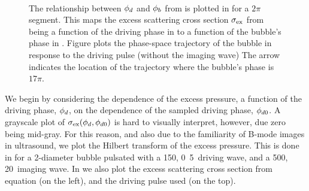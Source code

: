  \begin{figure}[p]
   \centering 
   \\
   \label{fig:FreqRatio}
    \caption{
      The relationship between ${\phi_d}$ and ${\phi_b}$ from  is plotted in  
      for a $2\pi$ segment.
      This maps the excess scattering cross section $\sigma_\textrm{ex}$ from being a function of the driving phase in 
       to a function of the bubble's phase in 
      .
      Figure  plots the phase-space trajectory of the 
      bubble in response to the driving pulse (without the imaging wave)
      The arrow indicates the location of the trajectory where the bubble's phase is $17\pi$.
   }
   \label{fig:excess_vs_phase:mapping}
 \end{figure}
We begin by considering the dependence of the excess pressure, a function of the driving phase, ${\phi_d}$,
on the dependence of the sampled driving phase, ${\phi_{d0}}$.
%
%
A grayscale plot of $\sigma_\textrm{ex}({\phi_d},{\phi_{d0}})$ is hard to visually interpret, however,
due zero being mid-gray.
For this reason, and also due to the familiarity of B-mode images in ultrasound,
we plot the Hilbert transform of the excess pressure.
This is done in   for a \unit{2}\micro\metre-diameter 
bubble pulsated with a \unit{150}\kilo\pascal, 
\unit{0.5}\mega\hertz\ driving wave, 
and a \unit{500}\kilo\pascal, \unit{20}\mega\hertz\ imaging wave.
In  we also plot the excess scattering cross section from equation  (on the left),
and the driving pulse used (on the top).




